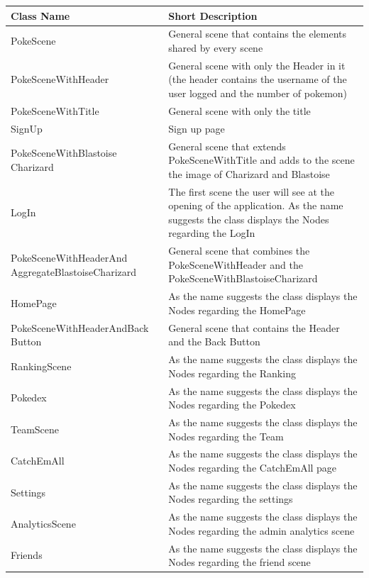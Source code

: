 \begin{center}
	\begin{longtable}{| m{14em} | m{19em} |} 
		\hline
		\textbf{Class Name} & \textbf{Short Description} \\ [0.5ex] 
		\hline
		PokeScene & General scene that contains the elements shared by every scene\\ 
		\hline
		PokeSceneWithHeader & General scene with only the Header in it (the header contains the username of the user logged and the number of pokemon)\\ 
		\hline
		PokeSceneWithTitle & General scene with only the title\\ 
		\hline
		SignUp & Sign up page\\ 
		\hline
		PokeSceneWithBlastoise Charizard & General scene that extends PokeSceneWithTitle and adds to the scene the image of Charizard and Blastoise\\ 
		\hline
		LogIn & The first scene the user will see at the opening of the application. As the name suggests the class displays the Nodes regarding the LogIn\\ 
		\hline
		PokeSceneWithHeaderAnd AggregateBlastoiseCharizard & General scene that combines the PokeSceneWithHeader and the PokeSceneWithBlastoiseCharizard\\ 
		\hline
		HomePage & As the name suggests the class displays the Nodes regarding the HomePage\\ 
		\hline
		PokeSceneWithHeaderAndBack Button & General scene that contains the Header and the Back Button\\ 
		\hline
		RankingScene & As the name suggests the class displays the Nodes regarding the Ranking\\ 
		\hline
		Pokedex & As the name suggests the class displays the Nodes regarding the Pokedex\\ 
		\hline
		TeamScene & As the name suggests the class displays the Nodes regarding the Team\\
		\hline
		CatchEmAll & As the name suggests the class displays the Nodes regarding the CatchEmAll page\\
		\hline
		Settings & As the name suggests the class displays the Nodes regarding the settings\\
		\hline
		AnalyticsScene & As the name suggests the class displays the Nodes regarding the admin analytics scene\\
		\hline
		Friends & As the name suggests the class displays the Nodes regarding the friend scene\\

\end{longtable}
\end{center}
